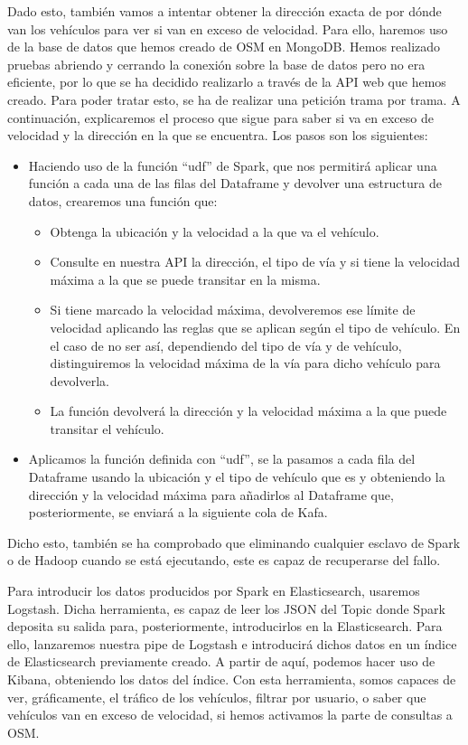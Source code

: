 Dado esto, también vamos a intentar obtener la dirección exacta de por dónde van los vehículos para ver si van en exceso de velocidad. Para ello, haremos uso de la base de datos que hemos creado de OSM en MongoDB. Hemos realizado pruebas abriendo y cerrando la conexión sobre la base de datos pero no era eficiente, por lo que se ha decidido realizarlo a través de la API web que hemos creado. Para poder tratar esto, se ha de realizar una petición trama por trama. A continuación, explicaremos el proceso que sigue para saber si va en exceso de velocidad y la dirección en la que se encuentra. Los pasos son los siguientes:

\begin{itemize} 
	\item Haciendo uso de la función “udf” de Spark, que nos permitirá aplicar una función a cada una de las filas del Dataframe y devolver una estructura de datos, crearemos una función que:
	\begin{itemize} 
		\item Obtenga la ubicación y la velocidad a la que va el vehículo.
		\item Consulte en nuestra API la dirección, el tipo de vía y si tiene la velocidad máxima a la que se puede transitar en la misma.
		\item Si tiene marcado la velocidad máxima, devolveremos ese límite de velocidad aplicando las reglas que se aplican según el tipo de vehículo. En el caso de no ser así, dependiendo del tipo de vía y de vehículo, distinguiremos la velocidad máxima de la vía para dicho vehículo para devolverla.
		\item La función devolverá la dirección y la velocidad máxima a la que puede transitar el vehículo.
	\end{itemize} 
	\item Aplicamos la función definida con “udf”, se la pasamos a cada fila del Dataframe usando la ubicación y el tipo de vehículo que es y obteniendo la dirección y la velocidad máxima para añadirlos al Dataframe que, posteriormente, se enviará a la siguiente cola de Kafa.
\end{itemize} 
Dicho esto, también se ha comprobado que eliminando cualquier esclavo de Spark o de Hadoop cuando se está ejecutando, este es capaz de recuperarse del fallo.\par

Para introducir los datos producidos por Spark en Elasticsearch, usaremos Logstash. Dicha herramienta, es capaz de leer los JSON del Topic donde Spark deposita su salida para, posteriormente, introducirlos en la Elasticsearch. Para ello, lanzaremos nuestra pipe de Logstash e introducirá dichos datos en un índice de Elasticsearch previamente creado. A partir de aquí, podemos hacer uso de Kibana, obteniendo los datos del índice. Con esta herramienta, somos capaces de ver, gráficamente, el tráfico de los vehículos, filtrar por usuario, o saber que vehículos van en exceso de velocidad, si hemos activamos la parte de consultas a OSM.

